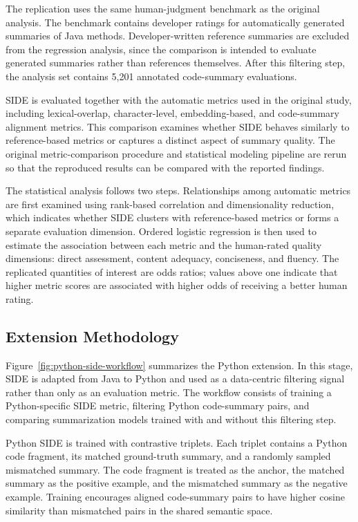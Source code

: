 The replication uses the same human-judgment benchmark as the original analysis. The benchmark contains developer ratings for automatically generated summaries of Java methods. Developer-written reference summaries are excluded from the regression analysis, since the comparison is intended to evaluate generated summaries rather than references themselves. After this filtering step, the analysis set contains 5,201 annotated code-summary evaluations.

SIDE is evaluated together with the automatic metrics used in the original study, including lexical-overlap, character-level, embedding-based, and code-summary alignment metrics. This comparison examines whether SIDE behaves similarly to reference-based metrics or captures a distinct aspect of summary quality. The original metric-comparison procedure and statistical modeling pipeline are rerun so that the reproduced results can be compared with the reported findings.

The statistical analysis follows two steps. Relationships among automatic metrics are first examined using rank-based correlation and dimensionality reduction, which indicates whether SIDE clusters with reference-based metrics or forms a separate evaluation dimension. Ordered logistic regression is then used to estimate the association between each metric and the human-rated quality dimensions: direct assessment, content adequacy, conciseness, and fluency. The replicated quantities of interest are odds ratios; values above one indicate that higher metric scores are associated with higher odds of receiving a better human rating.

\subsection{Extension Methodology}

Figure~\ref{fig:python-side-workflow} summarizes the Python extension. In this stage, SIDE is adapted from Java to Python and used as a data-centric filtering signal rather than only as an evaluation metric. The workflow consists of training a Python-specific SIDE metric, filtering Python code-summary pairs, and comparing summarization models trained with and without this filtering step.

Python SIDE is trained with contrastive triplets. Each triplet contains a Python code fragment, its matched ground-truth summary, and a randomly sampled mismatched summary. The code fragment is treated as the anchor, the matched summary as the positive example, and the mismatched summary as the negative example. Training encourages aligned code-summary pairs to have higher cosine similarity than mismatched pairs in the shared semantic space.

